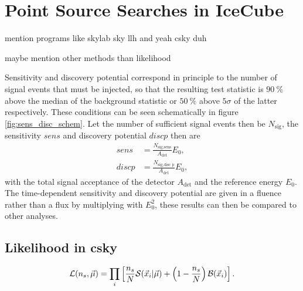 \chapter{Point Source Searches in IceCube} \label{sec:theory}

mention programs like skylab sky llh and yeah csky duh

maybe mention other methods than likelihood

Sensitivity and discovery potential correspond in principle to the number of signal events that must be injected, so that the resulting test statistic is $\SI{90}{\percent}$ above the median of the background statistic or $\SI{50}{\percent}$ above $\num{5}\sigma$ of the latter respectively.
These conditions can be seen schematically in figure \ref{fig:sens_disc_schem}.
Let the number of sufficient signal events then be $N_\text{sig}$, the sensitivity $sens$ and discovery potential $disc p$ then are
\begin{align}
  sens &= \frac{N_\text{sig,sens}}{A_\text{det}}E_0, \\
  disc p &= \frac{N_\text{sig,disc p}}{A_\text{det}}E_0,
\end{align}
with the total signal acceptance of the detector $A_\text{det}$ and the reference energy $E_0$.
The time-dependent sensitivity and discovery potential are given in a fluence rather than a flux by multiplying with $E_0^2$, these results can then be compared to other analyses.

\section{Likelihood in csky}

\begin{align}
  \mathcal{L}(n_s,\vec{\mu})
  = \prod_i \left[ 
    \frac{n_s}{N} \mathcal{S}(\vec{x}_i|\vec{\mu})
    + \left( 1 - \frac{n_s}{N} \right) \mathcal{B}(\vec{x}_i)
   \right].
  \label{eq:lh}
\end{align}
